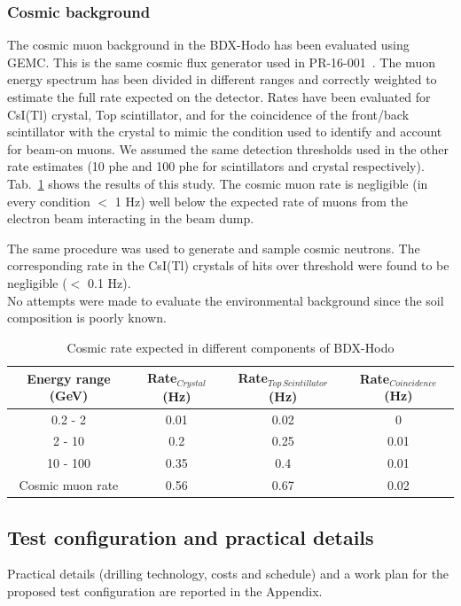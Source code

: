 \subsubsection{Cosmic background}
The cosmic muon background in the BDX-Hodo has been evaluated using GEMC. This is the same cosmic flux generator used in PR-16-001~\cite{bdx-proposal}. The muon energy spectrum has been divided in different ranges  and correctly weighted to estimate the full rate expected on the detector. Rates have been evaluated for CsI(Tl) crystal, Top scintillator,  and for the coincidence of the front/back scintillator with the crystal  to mimic the condition used to identify and account for beam-on muons. We assumed the same detection thresholds used in the other rate estimates (10 phe and 100 phe for scintillators and crystal respectively). Tab.~\ref{tab:cosmic} shows the results of this study. The cosmic muon  rate is negligible (in every condition $<$ 1 Hz) well below the expected rate of muons from the electron beam interacting in the beam dump.

The same procedure was used to generate and sample cosmic neutrons. The corresponding rate in the CsI(Tl) crystals of hits over threshold  were found to be negligible ($<$ 0.1 Hz).
\\

No attempts were made to evaluate the environmental background since the soil composition is poorly known.


\begin{table}[htp]
\caption{Cosmic rate expected in different components of BDX-Hodo}
\begin{center}
\begin{tabular}{|c|c|c|c|}
\hline
Energy range  (GeV) & Rate$_{Crystal}$  (Hz)&  Rate$_{Top\,Scintillator} $(Hz) & Rate$_{Coincidence}$ (Hz) \\
\hline\hline
 0.2 - 2  & 0.01 &  0.02 & 0\\
 \hline
 2 - 10  & 0.2 &  0.25 & 0.01\\
 \hline
 10 - 100  & 0.35 &  0.4 & 0.01\\
\hline\hline
Cosmic muon rate  & 0.56 &  0.67 & 0.02 \\
\hline\hline
\end{tabular}
\end{center}
\label{tab:cosmic}
\end{table}%

\subsection{Test configuration and practical details}
Practical details (drilling technology, costs and schedule) and a work plan for the proposed test configuration  are reported in the Appendix.

